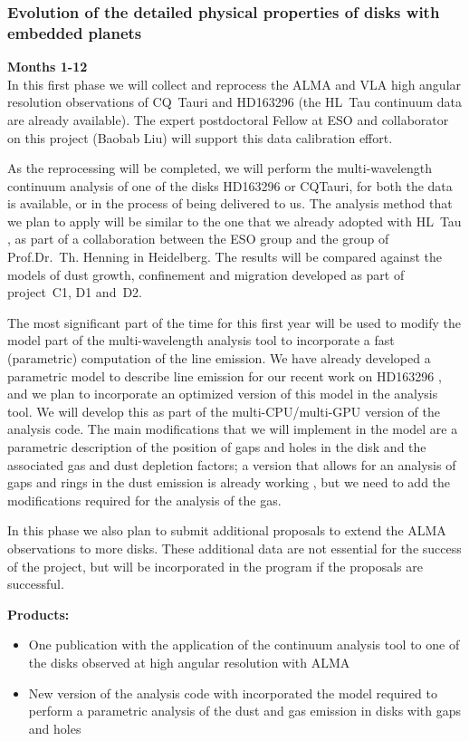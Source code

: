 \documentclass[10pt,fleqn,twoside]{article}
\begin{document}
\subsubsection{Evolution of the detailed physical properties of disks with embedded planets}

{\Tcol\bf Months 1-12}\\
In this first phase we will collect and reprocess the ALMA and VLA high angular resolution observations of CQ~Tauri and HD163296 (the HL~Tau continuum data are already available). The expert postdoctoral Fellow at ESO and collaborator on this project (Baobab Liu) will support this data calibration effort. 

As the reprocessing will be completed, we will perform the multi-wavelength continuum analysis of one of the disks HD163296 or CQTauri, for both the data is available, or in the process of being delivered to us. The analysis method that we plan to apply will be similar to the one that we already adopted with HL~Tau \citep{2016ApJ...821L..16C}, as part of a collaboration between the ESO group and the group of Prof.Dr.~Th. Henning in Heidelberg. The results will be compared against the models of dust growth, confinement and migration developed as part of project~C1, D1 and~D2.

The most significant part of the time for this first year will be used to modify the model part of the multi-wavelength analysis tool to incorporate a fast (parametric) computation of the line emission. We have already developed a parametric model to describe line emission for our recent work on HD163296 \citep{Isella2016}, and we plan to incorporate an optimized version of this model in the analysis tool. 
We will develop this as part of the multi-CPU/multi-GPU version of the analysis code.  The main modifications that we will implement in the model are a parametric description of the position of gaps and holes in the disk and the associated gas and dust depletion factors; a version that allows for an analysis of gaps and rings in the dust emission is already working \citep[e.g.\ ][]{2016A&A...588A.112G}, but we need to add the modifications required for the analysis of the gas.

In this phase we also plan to submit additional proposals to extend the ALMA observations to more disks. These additional data are not essential for the success of the project, but will be incorporated in the program if the proposals are successful.

\smallskip
{\bf Products:} 
\begin{itemize}
\item One publication with the application of the continuum analysis tool to one of the disks observed at high angular resolution with ALMA
\item New version of the analysis code with incorporated the model required to perform a parametric analysis of the dust and gas emission in disks with gaps and holes
\end{itemize}
\end{document}
